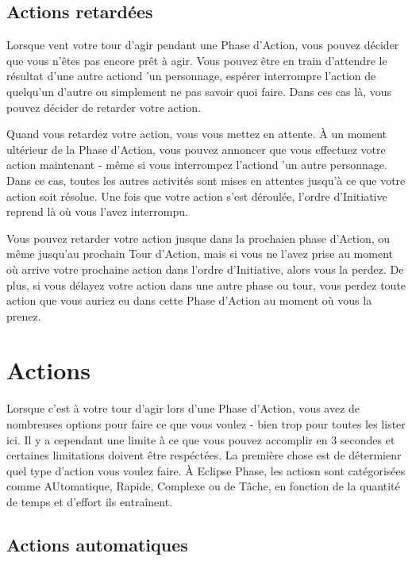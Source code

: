 \subsection{Actions retardées} \label{sec:delayed-actions} 

Lorsque vent votre tour d'agir pendant une Phase d'Action, vous pouvez décider que vous n'êtes pas encore prêt à agir. Vous pouvez être en train d'attendre le résultat d'une autre actiond 'un personnage, espérer interrompre l'action de quelqu'un d'autre ou simplement ne pas savoir quoi faire. Dans ces cas là, vous pouvez décider de retarder votre action. 

Quand vous retardez votre action, vous vous mettez en attente. À un moment ultérieur de la Phase d'Action, vous pouvez annoncer que vous effectuez votre action maintenant - même si vous interrompez l'actiond 'un autre personnage. Dans ce cas, toutes les autres activités sont mises en attentes jusqu'à ce que votre action soit résolue. Une fois que votre action s'est déroulée, l'ordre d'Initiative reprend là où vous l'avez interrompu. 

Vous pouvez retarder votre action jusque dans la prochaien phase d'Action, ou même jusqu'au prochain Tour d'Action, mais si vous ne l'avez prise au moment où arrive votre prochaine action dans l'ordre d'Initiative, alors vous la perdez. De plus, si vous délayez votre action dans une autre phase ou tour, vous perdez toute action que vous auriez eu dans cette Phase d'Action au moment où vous la prenez. 

\section{Actions} \label{sec:actions} 

Lorsque c'est à votre tour d'agir lors d'une Phase d'Action, vous avez de nombreuses options pour faire ce que vous voulez - bien trop pour toutes les lister ici. Il y a cependant une limite à ce que vous pouvez accomplir en 3 secondes et certaines limitations doivent être respéctées. La première chose est de détermienr quel type d'action vous voulez faire. À Eclipse Phase, les actiosn sont catégorisées comme AUtomatique, Rapide, Complexe ou de Tâche, en fonction de la quantité de temps et d'effort ils entraînent. 

\subsection{Actions automatiques} \label{sec:combat-automatic-actions} 

